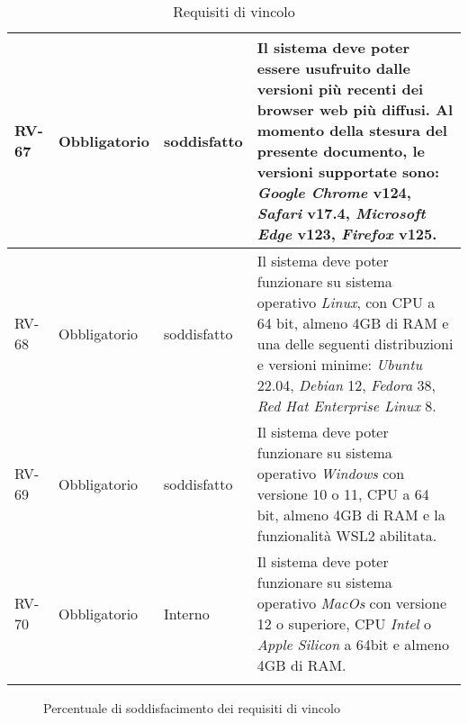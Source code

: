 \begin{longtable}{|>{\centering\arraybackslash}m{}|>{\centering\arraybackslash}m{}|>{\centering\arraybackslash}m{}|>{\centering\arraybackslash}m{}|}
	\\\hline
	RV-67           & Obbligatorio        & soddisfatto & Il sistema deve poter essere usufruito dalle versioni più recenti dei browser web più diffusi. Al momento della stesura del presente documento, le versioni supportate sono: \textit{Google Chrome} v124, \textit{Safari} v17.4, \textit{Microsoft Edge} v123, \textit{Firefox} v125.
	\\\hline
	RV-68           & Obbligatorio        & soddisfatto                                                                                                           & Il sistema deve poter funzionare su sistema operativo \textit{Linux}, con CPU a 64 bit, almeno 4GB di RAM e una delle seguenti distribuzioni e versioni minime: \textit{Ubuntu} 22.04, \textit{Debian} 12, \textit{Fedora} 38, \textit{Red Hat Enterprise Linux} 8.
	\\\hline
	RV-69           & Obbligatorio        & soddisfatto                                                                                                           & Il sistema deve poter funzionare su sistema operativo \textit{Windows} con versione 10 o 11, CPU a 64 bit, almeno 4GB di RAM e la funzionalità WSL2 abilitata.
	\\\hline
	RV-70           & Obbligatorio        & Interno                                                                                                           & Il sistema deve poter funzionare su sistema operativo \textit{MacOs} con versione 12 o superiore, CPU \textit{Intel} o \textit{Apple Silicon} a 64bit e almeno 4GB di RAM.
	\\\hline
	\caption{Requisiti di vincolo}
\end{longtable}

\begin{figure}[!h]
	\centering
	\caption{Percentuale di soddisfacimento dei requisiti di vincolo}
\end{figure}


